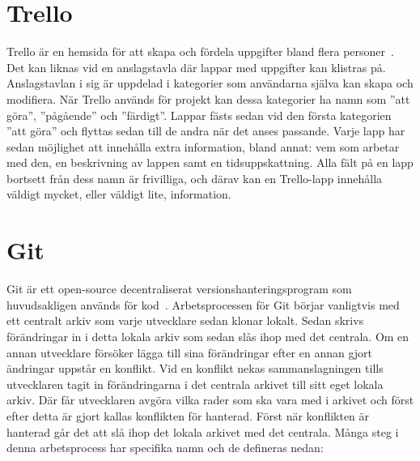 \section{Trello}
Trello är en hemsida för att skapa och fördela uppgifter bland flera personer~\cite{Trello}. Det kan liknas vid en anslagstavla där lappar med uppgifter kan klistras på. Anslagstavlan i sig är uppdelad i kategorier som användarna själva kan skapa och modifiera. När Trello används för projekt kan dessa kategorier ha namn som ''att göra'', ''pågående'' och ''färdigt''. Lappar fästs sedan vid den första kategorien ''att göra'' och flyttas sedan till de andra när det anses passande. Varje lapp har sedan möjlighet att innehålla extra information, bland annat: vem som arbetar med den, en beskrivning av lappen samt en tidsuppskattning. Alla fält på en lapp bortsett från dess namn är frivilliga, och därav kan en Trello-lapp innehålla väldigt mycket, eller väldigt lite, information.

\section{Git}
Git är ett open-source decentraliserat versionshanteringsprogram som huvudsakligen används för kod~\cite{Git}. Arbetsprocessen för Git börjar vanligtvis med ett centralt arkiv som varje utvecklare sedan klonar lokalt. Sedan skrivs förändringar in i detta lokala arkiv som sedan slås ihop med det centrala. Om en annan utvecklare försöker lägga till sina förändringar efter en annan gjort ändringar uppstår en konflikt. Vid en konflikt nekas sammanslagningen tills utvecklaren tagit in förändringarna i det centrala arkivet till sitt eget lokala arkiv. Där får utvecklaren avgöra vilka rader som ska vara med i arkivet och först efter detta är gjort kallas konflikten för hanterad. Först när konflikten är hanterad går det att slå ihop det lokala arkivet med det centrala. Många steg i denna arbetsprocess har specifika namn och de defineras nedan:

